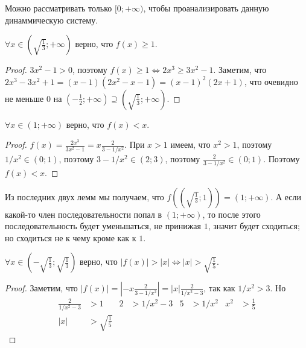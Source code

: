 \documentclass[12pt,a4paper]{article}
\begin{document}
\begin{enumproblem}[\textcolor{green}{сдано}]
        \begin{corollary}
            Можно рассматривать только $[0;+\infty)$, чтобы проанализировать данную динаммическую систему.
        \end{corollary}

        \begin{lemma}
            $\forall x \in (\sqrt{\frac{1}{3}}; +\infty)$ верно, что $f(x) \geqslant 1$.
        \end{lemma}

        \begin{proof}
            $3x^2 - 1 > 0$, поэтому $f(x) \geqslant 1 \Leftrightarrow 2x^3 \geqslant 3x^2 - 1$. Заметим, что $2x^3 - 3x^2 + 1 = (x-1)(2x^2 - x - 1) = (x-1)^2(2x+1)$, что очевидно не меньше $0$ на $(-\frac{1}{2}; +\infty) \supseteq (\sqrt{\frac{1}{3}}; +\infty)$.
        \end{proof}

        \begin{lemma}
            $\forall x \in (1; +\infty)$ верно, что $f(x) < x$.
        \end{lemma}

        \begin{proof}
            $f(x) = \frac{2x^3}{3x^2 - 1} = x\frac{2}{3-1/x^2}$. При $x > 1$ имеем, что $x^2 > 1$, поэтому $1/x^2 \in (0; 1)$, поэтому $3 - 1/x^2 \in (2; 3)$, поэтому $\frac{2}{3-1/x^2} \in (0;1)$. Поэтому $f(x) < x$.
        \end{proof}

        Из последних двух лемм мы получаем, что $f((\sqrt{\frac{1}{3}};1)) = (1;+\infty)$. А если какой-то член последовательности попал в $(1;+\infty)$, то после этого последовательность будет уменьшаться, не принижая $1$, значит будет сходиться; но сходиться не к чему кроме как к $1$.

        \begin{lemma}
            $\forall x \in (-\sqrt{\frac{1}{3}}; \sqrt{\frac{1}{3}})$ верно, что $|f(x)| > |x| \Leftrightarrow |x| > \sqrt{\frac{1}{5}}$.
        \end{lemma}

        \begin{proof}
            Заметим, что $|f(x)| = |-x\frac{2}{3-1/x^2}| = |x| \frac{2}{1/x^2-3}$, так как $1/x^2 > 3$. Но
            \begin{align*}
                \frac{2}{1/x^2 - 3} &> 1&
                2 &> 1/x^2 - 3&
                5 &> 1/x^2&
                x^2 &> \frac{1}{5}\\
                |x| &> \sqrt{\frac{1}{5}}&
            \end{align*}
        \end{proof}


\end{enumproblem}
\end{document}
